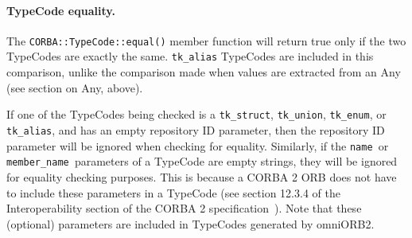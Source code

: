 \documentclass[11pt,twoside,onecolumn]{book}
\begin{document}
\paragraph*{TypeCode equality.}
The {\tt CORBA::TypeCode::equal()} member function will return true only if 
the two TypeCodes are exactly the same. {\tt tk\_alias} TypeCodes are included
in this comparison, unlike the comparison made when values are extracted from 
an Any (see section on Any, above). 

If one of the TypeCodes being checked is a {\tt tk\_struct}, {\tt tk\_union},
{\tt tk\_enum}, or {\tt tk\_alias}, and has an empty repository ID parameter,
then the repository ID parameter will be ignored when checking for equality. 
Similarly, if the {\tt name }or {\tt member\_name }parameters of a TypeCode are
empty strings, they will be ignored for equality checking purposes. This is 
because a CORBA 2 ORB does not have to include these parameters in a TypeCode 
(see section 12.3.4 of the Interoperability section of the CORBA 2 
specification~\cite{corba2-spec}). Note that these (optional) parameters are 
included in TypeCodes generated by omniORB2.


\newpage
\end{document}
